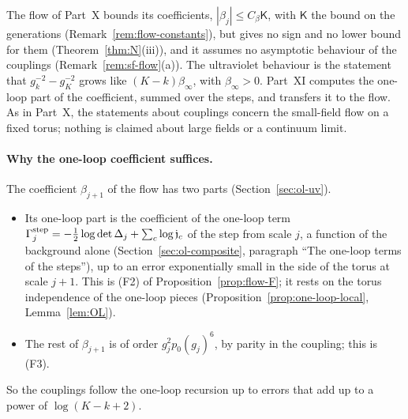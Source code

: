 \label{intro:XI}
The flow of Part~X bounds its coefficients, $|\beta_j|\le C_\beta\mathsf K$, with $\mathsf K$ the bound on the generations (Remark~\ref{rem:flow-constants}), but gives no sign and no lower bound for them (Theorem~\ref{thm:N}(iii)), and it assumes no asymptotic behaviour of the couplings (Remark~\ref{rem:sf-flow}(a)). The ultraviolet behaviour is the statement that $g_k^{-2}-g_K^{-2}$ grows like $(K-k)\beta_\infty$, with $\beta_\infty>0$. Part~XI computes the one-loop part of the coefficient, summed over the steps, and transfers it to the flow. As in Part~X, the statements about couplings concern the small-field flow on a fixed torus; nothing is claimed about large fields or a continuum limit.

\paragraph{Why the one-loop coefficient suffices.} The coefficient $\beta_{j+1}$ of the flow has two parts (Section~\ref{sec:ol-uv}).
\begin{itemize}
\item Its one-loop part is the coefficient of the one-loop term $\Gamma^{\rm step}_j=-\frac12\log\det\Delta_j+\sum_c\log\mathfrak j_c$ of the step from scale $j$, a function of the background alone (Section~\ref{sec:ol-composite}, paragraph ``The one-loop terms of the steps''), up to an error exponentially small in the side of the torus at scale $j+1$. This is (F2) of Proposition~\ref{prop:flow-F}; it rests on the torus independence of the one-loop pieces (Proposition~\ref{prop:one-loop-local}, Lemma~\ref{lem:OL}).
\item The rest of $\beta_{j+1}$ is of order $g_j^2p_0(g_j)^6$, by parity in the coupling; this is (F3).
\end{itemize}
So the couplings follow the one-loop recursion up to errors that add up to a power of $\log(K-k+2)$.

